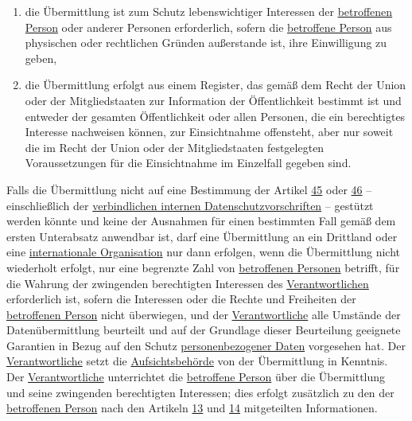 \begin{enumerate}
\begin{enumerate}
    \item die Übermittlung ist zum Schutz lebenswichtiger Interessen der \hyperref[itm:04-1]{betroffenen Person} oder anderer Personen
     erforderlich, sofern die \hyperref[itm:04-1]{betroffene Person} aus physischen oder rechtlichen Gründen außerstande ist, ihre
     Einwilligung zu geben,
    \label{itm:49-1-1f}

    \item die Übermittlung erfolgt aus einem Register, das gemäß dem Recht der Union oder der Mitgliedstaaten zur
     Information der Öffentlichkeit bestimmt ist und entweder der gesamten Öffentlichkeit oder allen Personen, die ein
     berechtigtes Interesse nachweisen können, zur Einsichtnahme offensteht, aber nur soweit die im Recht der Union
     oder der Mitgliedstaaten festgelegten Voraussetzungen für die Einsichtnahme im Einzelfall gegeben sind.
    \label{itm:49-1-1g}

  \end{enumerate}

  Falls die Übermittlung nicht auf eine Bestimmung der Artikel \hyperref[ch:45]{45} oder \hyperref[ch:46]
  {46} -- einschließlich der \hyperref[itm:04-20]{verbindlichen internen Datenschutzvorschriften} -- gestützt werden könnte und keine der
  Ausnahmen für einen bestimmten Fall gemäß dem ersten Unterabsatz anwendbar ist, darf eine Übermittlung an ein
  Drittland oder eine \hyperref[itm:04-29]{internationale Organisation} nur dann erfolgen, wenn die Übermittlung nicht wiederholt erfolgt,
  nur eine begrenzte Zahl von \hyperref[itm:04-1]{betroffenen Personen} betrifft, für die Wahrung der zwingenden berechtigten Interessen des
  \hyperref[itm:04-7]{Verantwortlichen} erforderlich ist, sofern die Interessen oder die Rechte und Freiheiten der \hyperref[itm:04-1]{betroffenen Person} nicht
  überwiegen, und der \hyperref[itm:04-7]{Verantwortliche} alle Umstände der Datenübermittlung beurteilt und auf der Grundlage dieser
  Beurteilung geeignete Garantien in Bezug auf den Schutz \hyperref[itm:04-1]{personenbezogener Daten} vorgesehen hat. Der \hyperref[itm:04-7]{Verantwortliche}
  setzt die \hyperref[itm:04-21]{Aufsichtsbehörde} von der Übermittlung in Kenntnis. Der \hyperref[itm:04-7]{Verantwortliche} unterrichtet die \hyperref[itm:04-1]{betroffene Person}
  über die Übermittlung und seine zwingenden berechtigten Interessen; dies erfolgt zusätzlich zu den der \hyperref[itm:04-1]{betroffenen
  Person} nach den Artikeln \hyperref[ch:13]{13} und \hyperref[ch:14]{14} mitgeteilten Informationen.
  \label{itm:49-1-2}


\end{enumerate}
